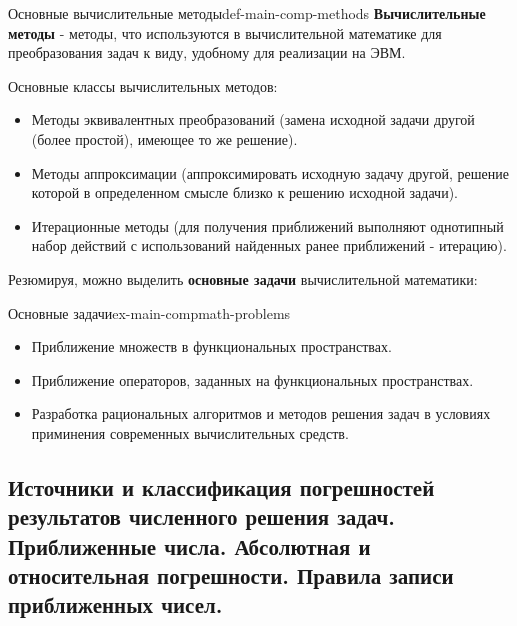 \documentclass[14pt]{extarticle}
\begin{document}
        \begin{definition}{Основные вычислительные методы}{def-main-comp-methods}
            \textbf{Вычислительные методы} - методы, что используются в вычислительной математике для преобразования задач к виду, удобному для реализации на ЭВМ.

            \vspace{\baselineskip}

            Основные классы вычислительных методов:
            \begin{itemize}
                \item Методы эквивалентных преобразований (замена исходной задачи другой (более простой), имеющее то же решение).
                \item Методы аппроксимации (аппроксимировать исходную задачу другой, решение которой в определенном смысле близко к решению исходной задачи).
                \item Итерационные методы (для получения приближений выполняют однотипный набор действий с использований найденных ранее приближений - итерацию).
            \end{itemize}

        \end{definition}

        Резюмируя, можно выделить \textbf{основные задачи} вычислительной математики:

        \begin{example}{Основные задачи}{ex-main-compmath-problems}
            \begin{itemize}
                \item Приближение множеств в функциональных пространствах.
                \item Приближение операторов, заданных на функциональных пространствах.
                \item Разработка рациональных алгоритмов и методов решения задач в условиях приминения современных вычислительных средств.
            \end{itemize}
        \end{example}

\clearpage
\subsection{Источники и классификация погрешностей результатов численного решения задач. Приближенные числа. Абсолютная и относительная погрешности. Правила записи приближенных чисел.}
\end{document}
